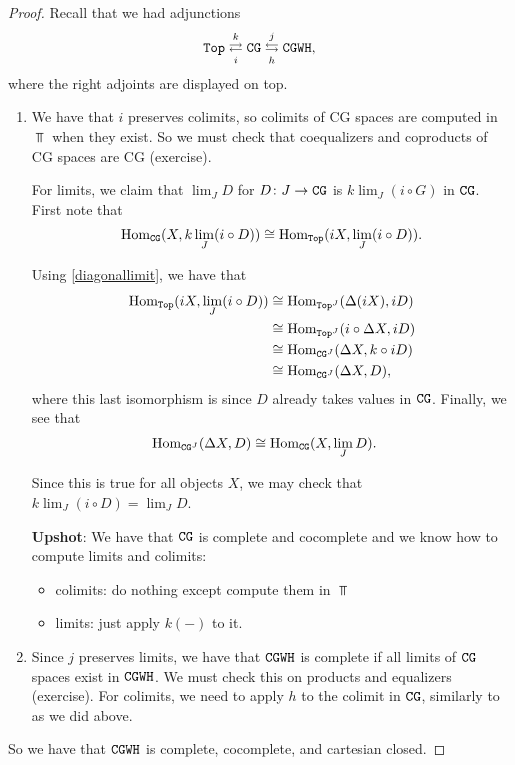 \documentclass{article}[11pt]
\begin{document}
\begin{proof}

Recall that we had adjunctions
\begin{align*}
	\texttt{Top} \overset{k}{\underset{i}{\rightleftarrows}} \texttt{CG} \overset{j}{\underset{h}{\leftrightarrows}} \texttt{CGWH},
\end{align*}
where the right adjoints are displayed on top.

\begin{enumerate}
	\item We have that $i$ preserves colimits, so colimits of CG spaces are computed in $\Top$ when they exist. So we must check that coequalizers and coproducts of CG spaces are CG (exercise).

	For limits, we claim that $\displaystyle \lim_J D$ for $D\colon J\to \texttt{CG}$ is $\displaystyle k\lim_J (i\circ G)$ in $\texttt{CG}$.
First note that
	\begin{align*}
		\textup{Hom}_{\texttt{CG}} (X, k\lim_J (i\circ D)) \cong \textup{Hom}_{\texttt{Top}} (iX, \lim_J (i \circ D)).
	\end{align*}
	
	Using \autoref{diagonallimit}, we have that
	\begin{align*}
		\textup{Hom}_{\texttt{Top}} (iX, \lim_J( i \circ D)) &\cong \textup{Hom}_{\texttt{Top}^J} (\Delta(iX), iD) \\
		&\cong \textup{Hom}_{\texttt{Top}^J} (i\circ \Delta X, iD) \\
		&\cong \textup{Hom}_{\texttt{CG}^J} (\Delta X, k\circ iD) \\
		&\cong \textup{Hom}_{\texttt{CG}^J}(\Delta X, D),
	\end{align*}
	where this last isomorphism is since $D$ already takes values in $\texttt{CG}$. Finally, we see that
	\begin{align*}
		\textup{Hom}_{\texttt{CG}^J}(\Delta X, D) &\cong \textup{Hom}_{\texttt{CG}} (X, \lim_J D).
	\end{align*}

	Since this is true for all objects $X$, we may check that $k\lim_J (i\circ D) = \lim_J D$.


	\textbf{Upshot}: We have that $\texttt{CG}$ is complete and cocomplete and we know how to compute limits and colimits:
	\begin{itemize}
		\item colimits: do nothing except compute them in $\Top$
		\item limits: just apply $k(-)$ to it.
	\end{itemize}

	\item Since $j$ preserves limits, we have that $\texttt{CGWH}$ is complete if all limits of $\texttt{CG}$ spaces exist in $\texttt{CGWH}$. We must check this on products and equalizers (exercise). For colimits, we need to apply $h$ to the colimit in $\texttt{CG}$, similarly to as we did above.
\end{enumerate}

So we have that $\texttt{CGWH}$ is complete, cocomplete, and cartesian closed.
\end{proof}
\end{document}
